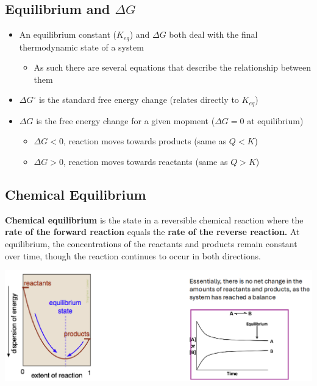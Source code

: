 \documentclass[10pt]{article}
\begin{document}
\subsection*{Equilibrium and $\Delta G$}
\begin{itemize}
    \item An equilibrium constant ($K_{eq}$) and $\Delta G$ both deal with the final thermodynamic state of a system
    \begin{itemize}
        \item As such there are several equations that describe the relationship between them
    \end{itemize}
    \item $\Delta G^\circ$ is the standard free energy change (relates directly to $K_{eq}$)
    \item $\Delta G$ is the free energy change for a given mopment ($\Delta G = 0$ at equilibrium)
    \begin{itemize}
        \item $\Delta G < 0$, reaction moves towards products (same as $Q < K$)
        \item $\Delta G > 0$, reaction moves towards reactants (same as $Q > K$)
    \end{itemize}
\end{itemize}
\begin{center}
\end{center}
\subsection*{Chemical Equilibrium}
\textbf{Chemical equilibrium} is the state in a reversible chemical reaction where the \textbf{rate of the forward reaction} equals the \textbf{rate of the reverse reaction.}  At equilibrium, the concentrations of the reactants and products remain constant over time, though the reaction continues to occur in both directions.
\begin{center}
    \includegraphics[width=\textwidth]{L4_3.png}
\end{center}
\end{document}
